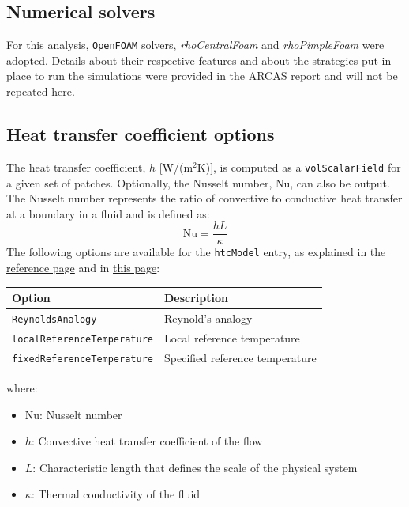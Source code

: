 \documentclass[12pt]{article}
\begin{document}
\subsection{Numerical solvers}\label{subsec:numerics}
For this analysis, \texttt{OpenFOAM} solvers, \textit{rhoCentralFoam} and \textit{rhoPimpleFoam} were adopted.
Details about their respective features and about the strategies put in place to run the simulations were provided in the ARCAS report and will not be repeated here.

\subsection{Heat transfer coefficient options}

The heat transfer coefficient, \( h \) [W/(m\(^2\)K)], is computed as a \texttt{volScalarField} for a given set of patches. Optionally, the Nusselt number, \( \text{Nu} \), can also be output. The Nusselt number represents the ratio of convective to conductive heat transfer at a boundary in a fluid and is defined as:
%
\begin{equation}
\text{Nu} = \frac{hL}{\kappa}
\end{equation}
%
The following options are available for the \texttt{htcModel} entry, as explained in the \href{https://www.openfoam.com/documentation/guides/v2006/api/classFoam_1_1functionObjects_1_1heatTransferCoeff.html#details}{reference page} and in \href{https://caefn.com/openfoam/bc}{this page}:

\begin{center}
\begin{tabular}{@{}ll@{}}
\toprule
\textbf{Option}                     & \textbf{Description}                      \\ 
\midrule
\texttt{ReynoldsAnalogy}            & Reynold's analogy                         \\ 
\texttt{localReferenceTemperature}  & Local reference temperature               \\ 
\texttt{fixedReferenceTemperature}  & Specified reference temperature           \\ 
\bottomrule
\end{tabular}
\end{center}

where:

\begin{itemize}
    \item \( \text{Nu} \): Nusselt number
    \item \( h \): Convective heat transfer coefficient of the flow
    \item \( L \): Characteristic length that defines the scale of the physical system
    \item \( \kappa \): Thermal conductivity of the fluid
\end{itemize}
\end{document}

